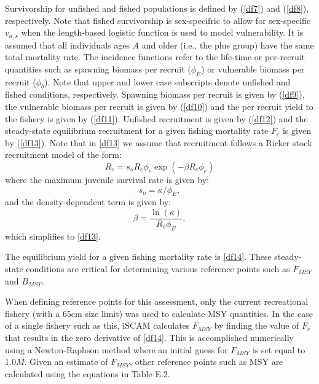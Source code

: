 \documentclass[11pt]{article}   %
\def\AppLet{E}                   %
\def\headc{\vspace{-1ex}} %
\def\subsub#1{\noindent {\bf #1} \headc}    %
\newcommand{\eref}[1]{(\ref{#1})}
\begin{document}
Survivorship for unfished and fished populations is defined by \eref{df7} and \eref{df8}, respectively.  Note that fished survivorship is sex-specifric to allow for sex-specific $v_{a,s}$ when the length-based logistic function is used to model vulnerability.  It is assumed that all individuals ages $A$ and older (i.e., the plus group) have the same total mortality rate.  The incidence functions refer to the life-time or per-recruit quantities such as spawning biomass per recruit ($\phi_E$) or vulnerable biomass per recruit ($\phi_b$).  Note that upper and lower case subscripts denote unfished and fished conditions, respectively.  Spawning biomass per recruit is given by \eref{df9}, the vulnerable biomass per recruit is given by \eref{df10} and the per recruit yield to the fishery is given by \eref{df11}.  Unfished recruitment is given by \eref{df12} and the steady-state equilibrium recruitment  for a given fishing mortality rate $F_e$ is given by \eref{df13}.  Note that in \eqref{df13} we assume that recruitment follows a  Ricker stock recruitment model of the form:
\[
R_e=%
    s_o R_e \phi_e \exp(-\beta R_e \phi_e) %
\]
where the maximum juvenile survival rate is given by:
\[
s_o = \kappa/\phi_E,
\]
and the density-dependent term is given by:
\[
\beta = %
    {\dfrac {\ln  \left( \kappa \right) }{R_{{o}}\phi_{{E}}}}, %
\]
which simplifies to \eqref{df13}.

The equilibrium yield for a given fishing mortality rate is \eqref{df14}.  These steady-state conditions are critical for determining various reference points such as $F_{MSY}$ and $B_{MSY}$. 


\subsub{MSY-based Reference Points}

When defining reference points for this assessment, only the current recreational fishery (with a 65cm size limit) was used to calculate MSY quantities.  In the case of a single fishery such as this, iSCAM calculates $F_{MSY}$ by finding the value of $F_e$ that results in the zero derivative of  \eqref{df14}.  This is accomplished numerically using a Newton-Raphson method where an initial guess for $F_{MSY}$ is set equal to 1.0$M$.  Given an estimate of $F_{MSY}$, other reference points such as MSY are calculated using the equations in Table \AppLet.2.   
\end{document}
